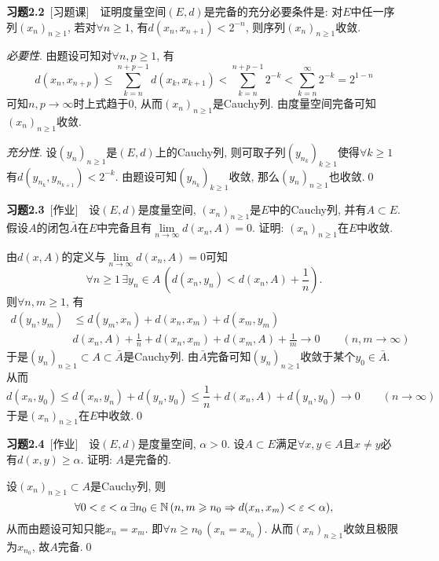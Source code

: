 	\textbf{习题2.2}\ [习题课]\ \ 证明度量空间$ (E,d) $是完备的充分必要条件是: 对$ E $中任一序列$ (x_n)_{n\geqslant 1} $, 若对$ \forall n\geqslant 1 $, 有$ d(x_n,x_{n+1})<2^{-n} $, 则序列$ (x_n)_{n\geqslant 1} $收敛.
	\begin{Proof}
	\textsl{必要性}. 由题设可知对$ \forall n,p\geqslant 1 $, 有
	\[
	d(x_n,x_{n+p})\leqslant\sum_{k=n}^{n+p-1}d(x_k,x_{k+1})<\sum_{k=n}^{n+p-1}2^{-k}<\sum_{k=n}^\infty 2^{-k}=2^{1-n}
	\]
	可知$ n, p\to\infty $时上式趋于0, 从而$ (x_n)_{n\geqslant 1} $是Cauchy列. 由度量空间完备可知$ (x_n)_{n\geqslant 1} $收敛.
	
	\textsl{充分性}. 设$ (y_n)_{n\geqslant 1} $是$ (E,d) $上的Cauchy列, 则可取子列$ (y_{n_k})_{k\geqslant 1} $使得$ \forall k\geqslant 1 $有$ d(y_{n_k},y_{n_{k+1}})<2^{-k} $. 由题设可知$ (y_{n_k})_{k\geqslant 1} $收敛, 那么$ (y_n)_{n\geqslant 1} $也收敛.\qed
	\end{Proof}
	
	\textbf{习题2.3}\ [作业]\ \ 设$ (E,d) $是度量空间, $ (x_n)_{n\geqslant 1} $是$ E $中的Cauchy列, 并有$ A\subset E $. 假设$ A $的闭包$ \bar{A} $在$ E $中完备且有$ \lim\limits_{n\to\infty}d(x_n,A)=0 $. 证明: $ (x_n)_{n\geqslant 1} $在$ E $中收敛.
	\begin{Proof}
	由$ d(x,A) $的定义与$ \lim\limits_{n\to\infty}d(x_n,A)=0 $可知
	\[
	\forall n\geqslant 1\,\exists y_n\in A\,\left(d(x_n,y_n)<d(x_n,A)+\frac{1}{n}\right).
	\]
	则$ \forall n,m\geqslant 1 $, 有
	\begin{align*}
	d(y_n,y_m)&\leqslant d(y_m,x_n)+d(x_n,x_m)+d(x_m,y_m)\\
	&d(x_n,A)+\frac{1}{n}+d(x_n,x_m)+d(x_m,A)+\frac{1}{m}\to 0\qquad (n,m\to\infty)
	\end{align*}
	于是$ (y_n)_{n\geqslant 1}\subset A\subset\bar{A} $是Cauchy列. 由$ \bar{A} $完备可知$ (y_n)_{n\geqslant 1} $收敛于某个$ y_0\in\bar{A} $. 从而
	\[
	d(x_n,y_0)\leqslant d(x_n,y_n)+d(y_n,y_0)\leqslant\frac{1}{n}+d(x_n,A)+d(y_n,y_0)\to 0\qquad(n\to\infty)
	\]
	于是$ (x_n)_{n\geqslant 1} $在$ E $中收敛.\qed
	\end{Proof}
	
	\textbf{习题2.4}\ [作业]\ \ 设$ (E,d) $是度量空间, $ \alpha>0 $. 设$ A\subset E $满足$ \forall x,y\in A $且$ x\ne y $必有$ d(x,y)\geqslant\alpha $. 证明: $ A $是完备的.
	\begin{Proof}
	设$ (x_n)_{n\geqslant 1}\subset A $是Cauchy列, 则
	\[
	\forall 0<\varepsilon<\alpha\,\exists n_0\in\mathbb{N}\,(n,m\geqslant n_0\Rightarrow d(x_n,x_m)<\varepsilon<\alpha),
	\]
	从而由题设可知只能$ x_n=x_m $. 即$ \forall n\geqslant n_0\,(x_n=x_{n_0}) $. 从而$ (x_n)_{n\geqslant 1} $收敛且极限为$ x_{n_0} $, 故$ A $完备.\qed
	\end{Proof}
	
